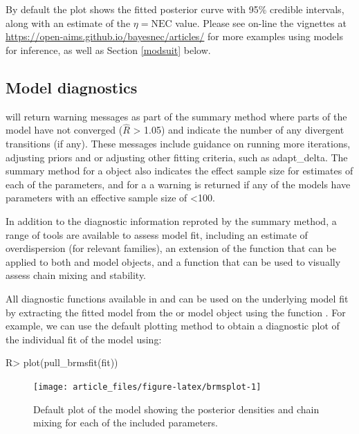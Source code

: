 \documentclass[
  shortnames]{jss}
\begin{document}
By default the plot shows the fitted posterior curve with 95\% credible intervals, along with an estimate of the \(\eta = \text{NEC}\) value. Please see on-line the vignettes at \url{https://open-aims.github.io/bayesnec/articles/} for more examples using  models for inference, as well as Section \ref{modsuit} below.

\subsection[Model diagnostics]{Model diagnostics}\label{moddiag}

 will return warning messages as part of the summary method where parts of the model have not converged (\(\widehat{R}\) \textgreater{} 1.05) and indicate the number of any divergent transitions (if any). These messages include guidance on running more iterations, adjusting priors and or adjusting other fitting criteria, such as adapt\_delta. The summary method for a  object also indicates the effect sample size for estimates of each of the parameters, and for a  a warning is returned if any of the models have parameters with an effective sample size of \textless100.

In addition to the diagnostic information reproted by the summary method, a range of tools are available to assess model fit, including an estimate of overdispersion (for relevant families), an extension of the   function that can be applied to both  and  model objects, and a function  that can be used to visually assess chain mixing and stability.

All diagnostic functions available in  and  can be used on the underlying  model fit by extracting the fitted  model from the  or  model object using the function . For example, we can use the default  plotting method to obtain a diagnostic plot of the individual fit of the  model using:

\begin{CodeChunk}
\begin{CodeInput}
R> plot(pull_brmsfit(fit))
\end{CodeInput}
\begin{figure}[!ht]

{\centering \texttt{[image: article\_files/figure-latex/brmsplot-1]} 

}

\caption[Default  plot of the  model showing the posterior densities and chain mixing for each of the included parameters]{Default  plot of the  model showing the posterior densities and chain mixing for each of the included parameters.}\label{fig:brmsplot}
\end{figure}
\end{CodeChunk}
\end{document}
